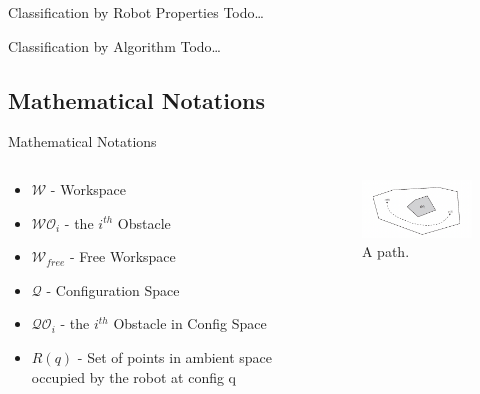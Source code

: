 \documentclass[handout]{beamer}
\begin{document}
  \begin{frame}{Classification by Robot Properties}
    Todo\dots
  \end{frame}

  \begin{frame}{Classification by Algorithm}
    Todo\dots
  \end{frame}

\subsection[Notations]{Mathematical Notations}

\begin{frame}{Mathematical Notations}
  
  \begin{columns}
    \begin{column}{0.5\textwidth}
      \begin{itemize}
        \item $\mathcal{W}$  - Workspace \pause
        \item $\mathcal{W} \mathcal{O}_{i} $ - the $i^{th}$ Obstacle \pause
        \item $\mathcal{W}_{free}$ - Free Workspace \pause
        \item $\mathcal{Q}$ - Configuration Space \pause
        \item $\mathcal{Q} \mathcal{O}_{i} $ - the $i^{th}$ Obstacle in Config Space \pause
        \item $R(q)$ - Set of points in ambient space occupied by the robot at config q
        \end{itemize}
    \end{column}
    \begin{column}{0.5\textwidth}  %
        \begin{center}
          \begin{figure}
            \includegraphics[width=60mm]{fig/fig_01.png}
            \caption{A path.}
            \label{fig:fig01}
          \end{figure}
         \end{center}
    \end{column}
    \end{columns}
\end{frame}
\end{document}
